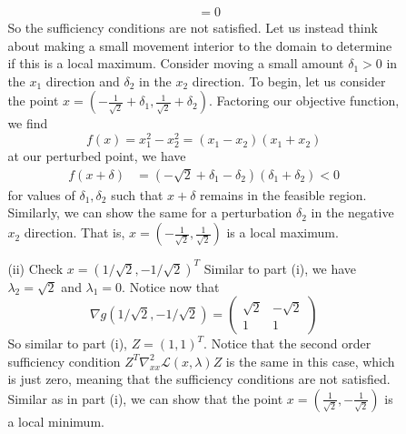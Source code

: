 \documentclass{article}
\begin{document}
\begin{itemize}
\begin{itemize}
\begin{itemize}
\begin{align*}
                &= 0
            \end{align*}
            So the sufficiency conditions are not satisfied. Let us instead think about making a small movement interior to the domain to determine if this is a local maximum. Consider moving a small amount $\delta_1 > 0$ in the $x_1$ direction and $\delta_2$ in the $x_2$ direction. To begin, let us consider the point $x = \left(-\frac{1}{\sqrt{2}} + \delta_1, \frac{1}{\sqrt{2}} + \delta_2\right)$. Factoring our objective function, we find
            \[f(x) = x_1^2 - x_2^2 = (x_1 - x_2)(x_1 + x_2)\]
            at our perturbed point, we have
            \begin{align*}
                f(x+\delta) &= (-\sqrt{2} + \delta_1 - \delta_2)(\delta_1 + \delta_2)
                < 0
            \end{align*}
            for values of $\delta_1,\delta_2$ such that $x + \delta$ remains in the feasible region. Similarly, we can show the same for a perturbation $\delta_2$ in the negative $x_2$ direction. That is, $x = (-\tfrac{1}{\sqrt{2}},\tfrac{1}{\sqrt{2}})$ is a local maximum. 

            \item[(ii)] Check $x = (1/\sqrt{2},-1/\sqrt{2})^T$
            \newline
            Similar to part (i), we have $\lambda_2 = \sqrt{2}$ and $\lambda_1 = 0$. Notice now that 
            \[\nabla g(1/\sqrt{2},-1/\sqrt{2}) = \begin{pmatrix}
                \sqrt{2} & -\sqrt{2}\\
                1 & 1
            \end{pmatrix}\]
            So similar to part (i), $Z = (1,1)^T$. Notice that the second order sufficiency condition $Z^T\nabla_{xx}^2\mathscr{L}(x,\lambda)Z$ is the same in this case, which is just zero, meaning that the sufficiency conditions are not satisfied. Similar as in part (i), we can show that the point $x = (\tfrac{1}{\sqrt{2}},-\tfrac{1}{\sqrt{2}})$ is a local minimum.
            \newline
        \end{itemize}
        

\end{itemize}
\end{itemize}
\end{document}
